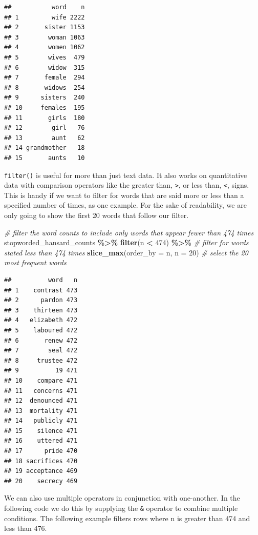 \documentclass[
]{article}
\newenvironment{Shaded}{\begin{snugshade}}{\end{snugshade}}
\newcommand{\AttributeTok}[1]{\textcolor[rgb]{0.13,0.29,0.53}{#1}}
\newcommand{\CommentTok}[1]{\textcolor[rgb]{0.56,0.35,0.01}{\textit{#1}}}
\newcommand{\DecValTok}[1]{\textcolor[rgb]{0.00,0.00,0.81}{#1}}
\newcommand{\FunctionTok}[1]{\textcolor[rgb]{0.13,0.29,0.53}{\textbf{#1}}}
\newcommand{\NormalTok}[1]{#1}
\newcommand{\SpecialCharTok}[1]{\textcolor[rgb]{0.81,0.36,0.00}{\textbf{#1}}}
\begin{document}
\begin{verbatim}
##           word    n
## 1         wife 2222
## 2       sister 1153
## 3        woman 1063
## 4        women 1062
## 5        wives  479
## 6        widow  315
## 7       female  294
## 8       widows  254
## 9      sisters  240
## 10     females  195
## 11       girls  180
## 12        girl   76
## 13        aunt   62
## 14 grandmother   18
## 15       aunts   10
\end{verbatim}

\texttt{filter()} is useful for more than just text data. It also works
on quantitative data with comparison operators like the greater than,
\texttt{\textgreater{}}, or less than, \texttt{\textless{}}, signs. This
is handy if we want to filter for words that are said more or less than
a specified number of times, as one example. For the sake of
readability, we are only going to show the first 20 words that follow
our filter.

\begin{Shaded}
\begin{Highlighting}[]
\CommentTok{\# filter the word counts to include only words that appear fewer than 474 times}
\NormalTok{stopworded\_hansard\_counts }\SpecialCharTok{\%\textgreater{}\%} 
  \FunctionTok{filter}\NormalTok{(n }\SpecialCharTok{\textless{}} \DecValTok{474}\NormalTok{) }\SpecialCharTok{\%\textgreater{}\%} \CommentTok{\# filter for words stated less than 474 times}
  \FunctionTok{slice\_max}\NormalTok{(}\AttributeTok{order\_by =}\NormalTok{ n, }\AttributeTok{n =} \DecValTok{20}\NormalTok{) }\CommentTok{\# select the 20 most frequent words}
\end{Highlighting}
\end{Shaded}

\begin{verbatim}
##          word   n
## 1    contrast 473
## 2      pardon 473
## 3    thirteen 473
## 4   elizabeth 472
## 5    laboured 472
## 6       renew 472
## 7        seal 472
## 8     trustee 472
## 9          19 471
## 10    compare 471
## 11   concerns 471
## 12  denounced 471
## 13  mortality 471
## 14   publicly 471
## 15    silence 471
## 16    uttered 471
## 17      pride 470
## 18 sacrifices 470
## 19 acceptance 469
## 20    secrecy 469
\end{verbatim}

We can also use multiple operators in conjunction with one-another. In
the following code we do this by supplying the \texttt{\&} operator to
combine multiple conditions. The following example filters rows where n
is greater than 474 and less than 476.
\end{document}
